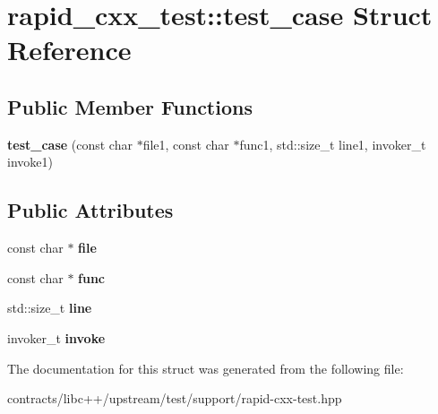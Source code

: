 \hypertarget{structrapid__cxx__test_1_1test__case}{}\section{rapid\+\_\+cxx\+\_\+test\+:\+:test\+\_\+case Struct Reference}
\label{structrapid__cxx__test_1_1test__case}
\subsection*{Public Member Functions}
\begin{DoxyCompactItemize}
\item 
\mbox{\label{structrapid__cxx__test_1_1test__case_a25189b6092b4107251cf415cac817123}} 
{\bfseries test\+\_\+case} (const char $\ast$file1, const char $\ast$func1, std\+::size\+\_\+t line1, invoker\+\_\+t invoke1)
\end{DoxyCompactItemize}
\subsection*{Public Attributes}
\begin{DoxyCompactItemize}
\item 
\mbox{\label{structrapid__cxx__test_1_1test__case_a752030137211a8cb37eacefe1030459f}} 
const char $\ast$ {\bfseries file}
\item 
\mbox{\label{structrapid__cxx__test_1_1test__case_a7c0f6db380c9a87f8296b7329c2ad76c}} 
const char $\ast$ {\bfseries func}
\item 
\mbox{\label{structrapid__cxx__test_1_1test__case_a42df53af1a050066a5aef867491ff800}} 
std\+::size\+\_\+t {\bfseries line}
\item 
\mbox{\label{structrapid__cxx__test_1_1test__case_a2f439d1d6df95b92595e85bc204d8e78}} 
invoker\+\_\+t {\bfseries invoke}
\end{DoxyCompactItemize}


The documentation for this struct was generated from the following file\+:\begin{DoxyCompactItemize}
\item 
contracts/libc++/upstream/test/support/rapid-\/cxx-\/test.\+hpp\end{DoxyCompactItemize}
